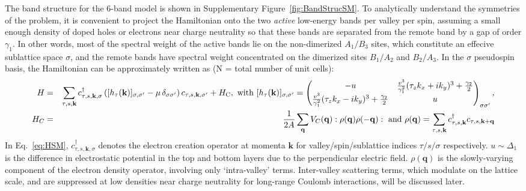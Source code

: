 \documentclass[aps,pra,twocolumn,superscriptaddress,10pt,article,nofootinbib,showpacs,longbibliography]{revtex4-1}
\def \k{{\mathbf k}}
\def \q{{\mathbf q}}
\def \beq{\begin{eqnarray}}
\def \eeq{\end{eqnarray}}
\def \nn{\nonumber \\}
\begin{document}
The band structure for the 6-band model is shown in Supplementary Figure~\ref{fig:BandStrucSM}.
To analytically understand the symmetries of the problem, it is convenient to project the Hamiltonian onto the two \textit{active} low-energy bands per valley per spin, assuming a small enough density of doped holes or electrons near charge neutrality so that these bands are separated from the remote band by a gap of order $\gamma_1$.
In other words, most of the spectral weight of the active bands lie on the non-dimerized $A_1/B_3$ sites, which constitute an effecive sublattice space $\sigma$, and the remote bands have spectral weight concentrated on the dimerized sites $B_1/A_2$ and $B_2/A_3$.  
In the $\sigma$ pseudospin basis, the Hamiltonian can be approximately written as (N = total number of unit cells):
\beq
H &=& \sum_{\tau,s,\k} c^\dagger_{\tau,s,\k, \sigma} \left([h_{\tau}(\k)]_{\sigma, \sigma^\prime} - \mu \, \delta_{\sigma \sigma^\prime} \right) c_{\tau,s, \k, \sigma^\prime} + H_{\rm C}, \text{ with } [h_{\tau}(\k)]_{\sigma, \sigma^\prime} = \begin{pmatrix} - u & \frac{v^3}{\gamma_1^2}(\tau_z k_x + i k_y)^3 + \frac{\gamma_2}{2} \\ \frac{v^3}{\gamma_1^2}(\tau_z k_x - i k_y)^3 + \frac{\gamma_2}{2} & u 
\end{pmatrix}_{\sigma \sigma^\prime}, \nn 
 H_C &=& \frac{1}{2A} \sum_{\q} V_C(\q) :\rho(\q) \rho(-\q): \text{ and } \rho(\q) = \sum_{\tau,s,\k} c^\dagger_{\tau,s,\k} c_{\tau,s,\k+\q} 
\label{eq:HSM}
\eeq
In Eq.~\eqref{eq:HSM}, $c^\dagger_{\tau,s,\k, \sigma}$ denotes the electron creation operator at momenta $\k$ for valley/spin/sublattice indices $\tau/s/\sigma$ respectively. 
$u \sim \Delta_1$ is the difference in electrostatic potential in the top and bottom layers due to the perpendicular electric field.
$\rho(\q)$ is the slowly-varying component of the electron density operator, involving only `intra-valley' terms. 
Inter-valley scattering terms, which modulate on the lattice scale, and are suppressed at low densities near charge neutrality for long-range Coulomb interactions, will be discussed later.
\end{document}
